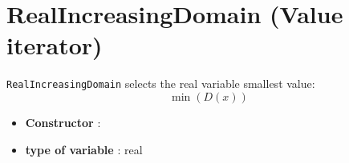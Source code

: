 \section{RealIncreasingDomain (Value iterator)}\label{realincreasingdomain:realincreasingdomainvaliterator}\hypertarget{realincreasingdomain:realincreasingdomainvaliterator}{}
\begin{notedef}
  \texttt{RealIncreasingDomain} selects the real variable smallest value:
$$\min(D(x))$$
\end{notedef}

\begin{itemize}
	\item \textbf{Constructor} : 
	\item \textbf{type of variable} : real
\end{itemize}

%

